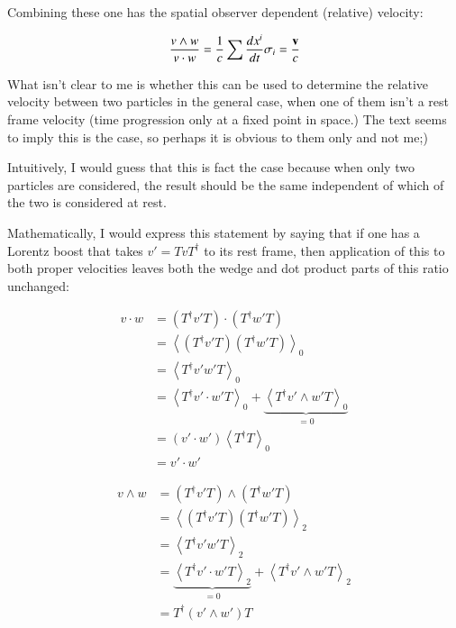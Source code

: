 \documentclass{article}      %
\newcommand{\gpgrade}[2] {{\left\langle{{#1}}\right\rangle}_{#2}}
\newcommand{\gpgradezero}[1] {\gpgrade{#1}{0}}
\newcommand{\gpgradetwo}[1] {\gpgrade{#1}{2}}
\begin{document}
Combining these one has the spatial observer dependent (relative) velocity:

\begin{equation}
\frac{v \wedge w}{v \cdot w} = \frac{1}{c} \sum \frac{d x^{i}}{dt} \sigma_{i} = \frac{\mathbf{v}}{c}
\end{equation}

What isn't clear to me is whether this can be used to determine the relative velocity between two particles in the general case, when one of them isn't a rest frame velocity (time progression only at a fixed point in space.)
The text seems
to imply this is the case, so perhaps it is obvious to them only and not me;)

Intuitively, I would guess that this is fact the case because when only two particles are considered, the result should be the same independent of which of the
two is considered at rest.

Mathematically, I would express this statement by saying that if one has
a Lorentz boost that takes $v' = T v T^\dagger$ to its rest frame, then application of this to both proper velocities leaves both the wedge and dot product 
parts of this ratio unchanged:

\begin{align*}
v \cdot w 
&= \left(T^\dagger v' T\right) \cdot \left(T^\dagger w' T\right) \\
&= \gpgradezero{\left(T^\dagger v' T\right) \left(T^\dagger w' T\right)} \\
&= \gpgradezero{T^\dagger v' w' T} \\
&= \gpgradezero{T^\dagger v' \cdot w' T} + \underbrace{\gpgradezero{T^\dagger v' \wedge w' T}}_{=0} \\
&= \left(v' \cdot w'\right)\gpgradezero{T^\dagger T} \\
&= v' \cdot w'
\end{align*}

\begin{align*}
v \wedge w 
&= \left(T^\dagger v' T\right) \wedge \left(T^\dagger w' T\right) \\
&= \gpgradetwo{\left(T^\dagger v' T\right) \left(T^\dagger w' T\right)} \\
&= \gpgradetwo{T^\dagger v' w' T} \\
&= \underbrace{\gpgradetwo{T^\dagger v' \cdot w' T}}_{=0} + \gpgradetwo{T^\dagger v' \wedge w' T} \\
&= T^\dagger \left(v' \wedge w'\right) T
\end{align*}
\end{document}
